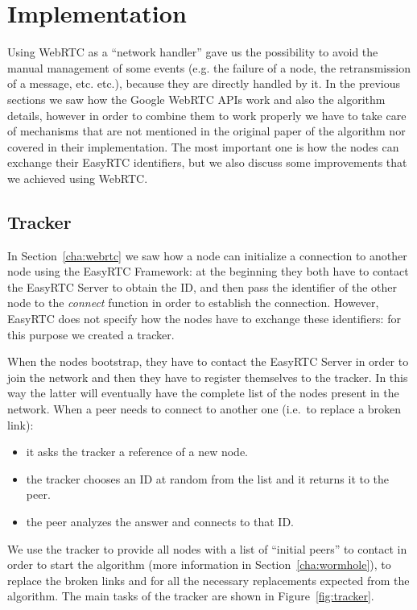 
\chapter{Implementation}
\label{cha:implementation}
Using WebRTC as a ``network handler'' gave us the possibility to avoid the manual management of some events (e.g. the failure of a node, the retransmission of a message, etc. etc.), because they are directly handled by it. In the previous sections we saw how the Google WebRTC APIs work and also the algorithm details, however in order to combine them to work properly we have to take care of mechanisms that are not mentioned in the original paper of the algorithm nor covered in their implementation. The most important one is how the nodes can exchange their EasyRTC identifiers, but we also discuss some improvements that we achieved using WebRTC.

\section{Tracker}
\label{cha:tracker}
In Section~\ref{cha:webrtc} we saw how a node can initialize a connection to another node using the EasyRTC Framework: at the beginning they both have to contact the EasyRTC Server to obtain the ID, and then pass the identifier of the other node to the \textsf{\textit{connect}} function in order to establish the connection. However, EasyRTC does not specify how the nodes have to exchange these identifiers: for this purpose we created a tracker. 

When the nodes bootstrap, they have to contact the EasyRTC Server in order to join the network and then they have to register themselves to the tracker. In this way the latter will eventually have the complete list of the nodes present in the network. When a peer needs to connect to another one (i.e.\ to replace a broken link):
\begin{itemize}
	\item it asks the tracker a reference of a new node.
	\item the tracker chooses an ID at random from the list and it returns it to the peer.
	\item the peer analyzes the answer and connects to that ID.
\end{itemize}

We use the tracker to provide all nodes with a list of ``initial peers'' to contact in order to start the algorithm (more information in Section~\ref{cha:wormhole}), to replace the broken links and for all the necessary replacements expected from the algorithm. The main tasks of the tracker are shown in Figure~\ref{fig:tracker}.

